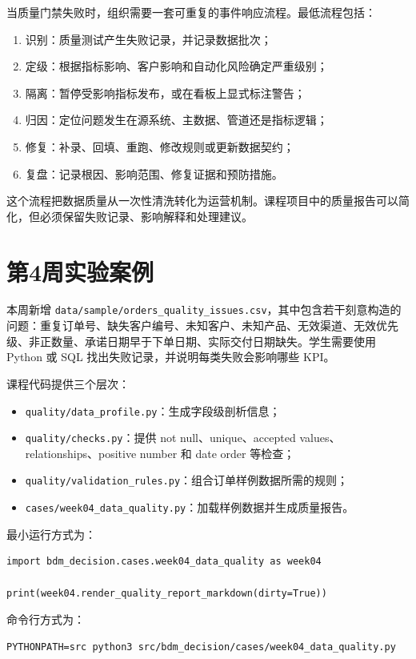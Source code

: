 \documentclass[UTF8,fontset=fandol,openany,zihao=-4]{ctexbook}
\begin{document}
当质量门禁失败时，组织需要一套可重复的事件响应流程。最低流程包括：
\begin{enumerate}
  \item 识别：质量测试产生失败记录，并记录数据批次；
  \item 定级：根据指标影响、客户影响和自动化风险确定严重级别；
  \item 隔离：暂停受影响指标发布，或在看板上显式标注警告；
  \item 归因：定位问题发生在源系统、主数据、管道还是指标逻辑；
  \item 修复：补录、回填、重跑、修改规则或更新数据契约；
  \item 复盘：记录根因、影响范围、修复证据和预防措施。
\end{enumerate}

这个流程把数据质量从一次性清洗转化为运营机制。课程项目中的质量报告可以简化，但必须保留失败记录、影响解释和处理建议。

\section{第4周实验案例}

本周新增 \texttt{data/sample/orders\_quality\_issues.csv}，其中包含若干刻意构造的问题：重复订单号、缺失客户编号、未知客户、未知产品、无效渠道、无效优先级、非正数量、承诺日期早于下单日期、实际交付日期缺失。学生需要使用 Python 或 SQL 找出失败记录，并说明每类失败会影响哪些 KPI。

课程代码提供三个层次：
\begin{itemize}
  \item \texttt{quality/data\_profile.py}：生成字段级剖析信息；
  \item \texttt{quality/checks.py}：提供 not null、unique、accepted values、relationships、positive number 和 date order 等检查；
  \item \texttt{quality/validation\_rules.py}：组合订单样例数据所需的规则；
  \item \texttt{cases/week04\_data\_quality.py}：加载样例数据并生成质量报告。
\end{itemize}

最小运行方式为：
\begin{lstlisting}[style=pythonstyle,caption={运行第4周数据质量案例}]
import bdm_decision.cases.week04_data_quality as week04

print(week04.render_quality_report_markdown(dirty=True))
\end{lstlisting}

命令行方式为：
\begin{lstlisting}[style=pythonstyle,caption={命令行运行案例代码}]
PYTHONPATH=src python3 src/bdm_decision/cases/week04_data_quality.py
\end{lstlisting}
\end{document}
